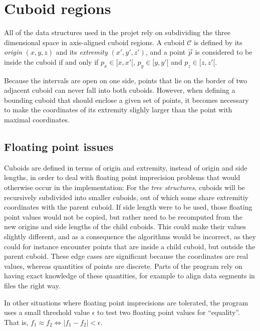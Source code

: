 \documentclass[a4paper,10pt,abstracton,notitlepage]{scrreprt}
\begin{document}
\section{Cuboid regions} \label{sec:cub_reg}
All of the data structures used in the projet rely on subdividing the three dimensional space in axis-aligned cuboid regions. A cuboid $\mathcal{C}$ is defined by its \emph{origin} $(x, y, z)$ and its \emph{extremity} $(x', y', z')$, and a point $\overrightarrow{p}$ is considered to be inside the cuboid if and only if $p_{x} \in [x, x'[$, $p_{y} \in [y, y'[$ and $p_{z} \in [z, z'[$.

Because the intervals are open on one side, points that lie on the border of two adjacent cuboid can never fall into both cuboids. However, when defining a bounding cuboid that should enclose a given set of points, it becomes necessary to make the coordinates of its extremity slighly larger than the point with maximal coordinates.

\subsection{Floating point issues}
Cuboids are defined in terms of origin and extremity, instead of origin and side lengths, in order to deal with floating point imprecision problems that would otherwise occur in the implementation: For the \emph{tree structures}, cuboids will be recursively subdivided into smaller cuboids, out of which some share extremitiy coordinates with the parent cuboid. If side length were to be used, those floating point values would not be copied, but rather need to be recomputed from the new origins and side lengths of the child cuboids. This could make their values slightly different, and as a consequence the algorithms would be incorrect, as they could for instance encounter points that are inside a child cuboid, but outside the parent cuboid.
These edge cases are significant because the coordinates are real values, whereas quantities of points are discrete. Parts of the program rely on having exact knowledge of these quantities, for example to align data segments in files the right way.

In other situations where floating point imprecisions are tolerated, the program uses a small threshold value $\epsilon$ to test two floating point values for ``equality''. That is, $f_{1} \approx f_{2} \Longleftrightarrow |f_{1} - f_{2}| < \epsilon$.
\end{document}
